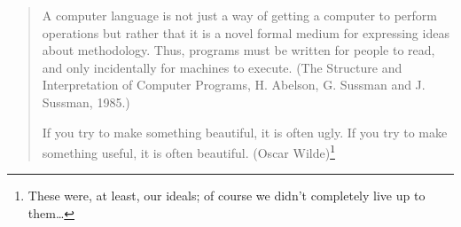
%
%
%
%


\nnormalsize
\ifprintedbook
\else
\begin{quote}
A computer language is not just a way of getting a computer to
perform operations but rather that it is a novel formal
medium for expressing ideas about methodology. Thus, programs
must be written for people to read, and only
incidentally for machines to execute.
(The Structure and Interpretation of Computer Programs, H. Abelson, G. Sussman
and J. Sussman, 1985.)

If you try to make something beautiful, it is often ugly.
If you try to make something useful, it is often beautiful.
(Oscar Wilde)\footnote{These were, at least, our ideals; of course we didn't
completely live up to them\ldots}
\end{quote}
\fi


